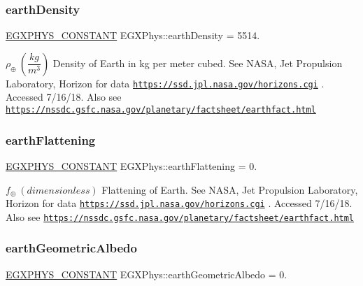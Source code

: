 \subsubsection{\texorpdfstring{earth\+Density}{earthDensity}}
{\footnotesize\ttfamily \mbox{\hyperlink{group___e_g_x_phys-_constants-_macros_ga76980d288494ce1714c9ac68a95ba702}{E\+G\+X\+P\+H\+Y\+S\+\_\+\+C\+O\+N\+S\+T\+A\+NT}} E\+G\+X\+Phys\+::earth\+Density = 5514.}

$\rho_{\oplus} \ (\dfrac{kg}{m^3})$ Density of Earth in kg per meter cubed. See N\+A\+SA, Jet Propulsion Laboratory, Horizon for data \href{https://ssd.jpl.nasa.gov/horizons.cgi}{\tt https\+://ssd.\+jpl.\+nasa.\+gov/horizons.\+cgi} . Accessed 7/16/18. Also see \href{https://nssdc.gsfc.nasa.gov/planetary/factsheet/earthfact.html}{\tt https\+://nssdc.\+gsfc.\+nasa.\+gov/planetary/factsheet/earthfact.\+html} \mbox{\label{group___e_g_x_phys-_constants-_astrophysics-_solar_system-_earth-_bulk_gaabbf1158b0f8e2f9545c8e4dc9b2e2bd}} 
\subsubsection{\texorpdfstring{earth\+Flattening}{earthFlattening}}
{\footnotesize\ttfamily \mbox{\hyperlink{group___e_g_x_phys-_constants-_macros_ga76980d288494ce1714c9ac68a95ba702}{E\+G\+X\+P\+H\+Y\+S\+\_\+\+C\+O\+N\+S\+T\+A\+NT}} E\+G\+X\+Phys\+::earth\+Flattening = 0.}

$f_{\oplus} \ (dimensionless)$ Flattening of Earth. See N\+A\+SA, Jet Propulsion Laboratory, Horizon for data \href{https://ssd.jpl.nasa.gov/horizons.cgi}{\tt https\+://ssd.\+jpl.\+nasa.\+gov/horizons.\+cgi} . Accessed 7/16/18. Also see \href{https://nssdc.gsfc.nasa.gov/planetary/factsheet/earthfact.html}{\tt https\+://nssdc.\+gsfc.\+nasa.\+gov/planetary/factsheet/earthfact.\+html} \mbox{\label{group___e_g_x_phys-_constants-_astrophysics-_solar_system-_earth-_bulk_ga4838765a5ca40d2cdde9691edd4ea45b}} 
\subsubsection{\texorpdfstring{earth\+Geometric\+Albedo}{earthGeometricAlbedo}}
{\footnotesize\ttfamily \mbox{\hyperlink{group___e_g_x_phys-_constants-_macros_ga76980d288494ce1714c9ac68a95ba702}{E\+G\+X\+P\+H\+Y\+S\+\_\+\+C\+O\+N\+S\+T\+A\+NT}} E\+G\+X\+Phys\+::earth\+Geometric\+Albedo = 0.}

